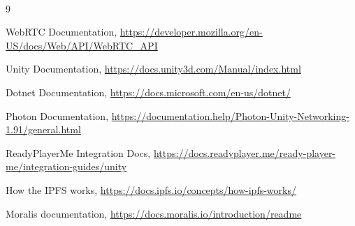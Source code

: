 
\nocite{*}\
\renewcommand{\bibname}{Webography}
\begin{thebibliography}{9}
    \raggedright
    WebRTC Documentation\emph{}, \url{https://developer.mozilla.org/en-US/docs/Web/API/WebRTC_API}

    Unity Documentation\emph{}, \url{https://docs.unity3d.com/Manual/index.html}
    
    Dotnet Documentation\emph{}, \url{https://docs.microsoft.com/en-us/dotnet/}
    
    Photon Documentation\emph{}, \url{https://documentation.help/Photon-Unity-Networking-1.91/general.html}
    
    ReadyPlayerMe Integration Docs\emph{}, \url{https://docs.readyplayer.me/ready-player-me/integration-guides/unity}
    
    How the IPFS works\emph{}, \url{https://docs.ipfs.io/concepts/how-ipfs-works/}
    
    Moralis documentation\emph{}, \url{https://docs.moralis.io/introduction/readme}
    
\end{thebibliography}

\printbibliography[title={References}]
